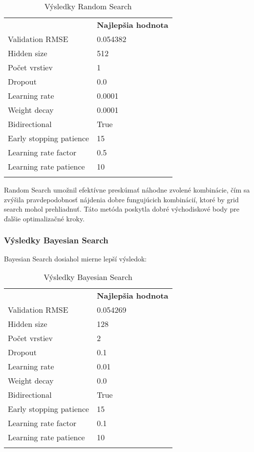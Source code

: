 \begin{table}[ht!]
\centering
\caption{Výsledky Random Search}\label{t:random_search}
\medskip
\small
\begin{tabular}{||l||l||}
\hhline{|t:==:t|}
\multicolumn{1}{||c||}{\textbf{Hyperparameter}} & \multicolumn{1}{c||}{\textbf{Najlepšia hodnota}} \\
\hhline{|:==:|}
Validation RMSE & 0.054382 \\
\hline
Hidden size & 512 \\
\hline
Počet vrstiev & 1 \\
\hline
Dropout & 0.0 \\
\hline
Learning rate & 0.0001 \\
\hline
Weight decay & 0.0001 \\
\hline
Bidirectional & True \\
\hline
Early stopping patience & 15 \\
\hline
Learning rate factor & 0.5 \\
\hline
Learning rate patience & 10 \\
\hhline{|b:==:b|}
\end{tabular}
\end{table}

Random Search umožnil efektívne preskúmať náhodne zvolené kombinácie, čím sa zvýšila pravdepodobnosť nájdenia dobre fungujúcich kombinácií, ktoré by grid search \cite{GridSearch} mohol prehliadnuť. Táto metóda poskytla dobré východiskové body pre ďalšie optimalizačné kroky.

\newpage

\subsubsection{Výsledky Bayesian Search}
\label{sec:bayesian_search}
Bayesian Search dosiahol mierne lepší výsledok:

\begin{table}[ht!]
\centering
\caption{Výsledky Bayesian Search}\label{t:bayesian_search}
\medskip
\small
\begin{tabular}{||l||l||}
\hhline{|t:==:t|}
\multicolumn{1}{||c||}{\textbf{Hyperparameter}} & \multicolumn{1}{c||}{\textbf{Najlepšia hodnota}} \\
\hhline{|:==:|}
Validation RMSE & 0.054269 \\
\hline
Hidden size & 128 \\
\hline
Počet vrstiev & 2 \\
\hline
Dropout & 0.1 \\
\hline
Learning rate & 0.01 \\
\hline
Weight decay & 0.0 \\
\hline
Bidirectional & True \\
\hline
Early stopping patience & 15 \\
\hline
Learning rate factor & 0.1 \\
\hline
Learning rate patience & 10 \\
\hhline{|b:==:b|}
\end{tabular}
\end{table}

